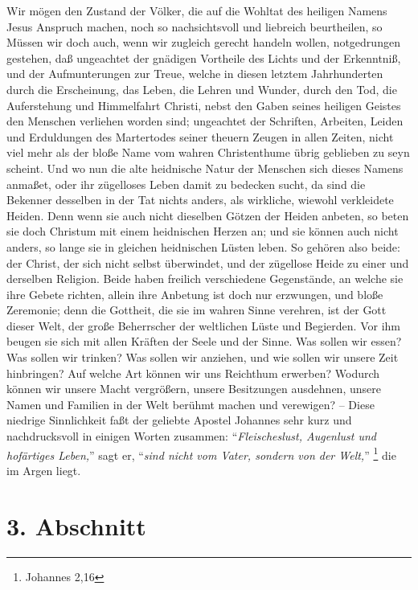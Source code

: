 Wir mögen den Zustand der Völker, die auf die Wohltat des heiligen Namens Jesus Anspruch machen, noch so nachsichtsvoll und liebreich beurtheilen, so Müssen wir doch auch, wenn wir zugleich gerecht handeln wollen, notgedrungen gestehen, daß ungeachtet der gnädigen Vortheile des Lichts und der Erkenntniß, und der Aufmunterungen zur Treue, welche in diesen letztem Jahrhunderten durch die Erscheinung, das Leben, die Lehren und Wunder, durch den Tod, die Auferstehung und Himmelfahrt Christi, nebst den Gaben seines heiligen Geistes den Menschen verliehen worden sind; ungeachtet der Schriften, Arbeiten, Leiden und Erduldungen des Martertodes seiner theuern Zeugen in allen Zeiten, nicht viel mehr als der bloße Name vom wahren Christenthume übrig geblieben zu seyn scheint. Und wo nun die alte heidnische Natur der Menschen sich dieses Namens anmaßet, oder ihr zügelloses Leben damit zu bedecken sucht, da sind die Bekenner desselben in der Tat nichts anders, als wirkliche, wiewohl verkleidete Heiden. Denn wenn sie auch nicht dieselben Götzen der Heiden anbeten, so beten sie doch Christum mit einem heidnischen Herzen an; und sie können auch nicht anders, so lange sie in gleichen heidnischen Lüsten leben. So gehören also beide: der Christ, der sich nicht selbst überwindet, und der zügellose Heide zu einer und derselben Religion. Beide haben freilich verschiedene Gegenstände, an welche sie ihre Gebete richten, allein ihre Anbetung ist doch nur erzwungen, und bloße Zeremonie; denn die Gottheit, die sie im wahren Sinne verehren, ist der Gott dieser Welt, der große Beherrscher der weltlichen Lüste und Begierden. Vor ihm beugen sie sich mit allen Kräften der Seele und der Sinne. Was sollen wir essen? Was sollen wir trinken? Was sollen wir anziehen, und wie sollen wir unsere Zeit hinbringen? Auf welche Art können wir uns Reichthum erwerben? Wodurch können wir unsere Macht vergrößern, unsere Besitzungen ausdehnen, unsere Namen und Familien in der Welt berühmt machen und verewigen? -- Diese niedrige Sinnlichkeit faßt der geliebte Apostel Johannes sehr kurz und nachdrucksvoll in einigen Worten zusammen: "`\textit{Fleischeslust, Augenlust und hofärtiges Leben,}"' sagt er, "`\textit{sind nicht vom Vater, sondern von der Welt,}"' \footnote{Johannes 2,16}  die im Argen liegt.

\section{3. Abschnitt}

